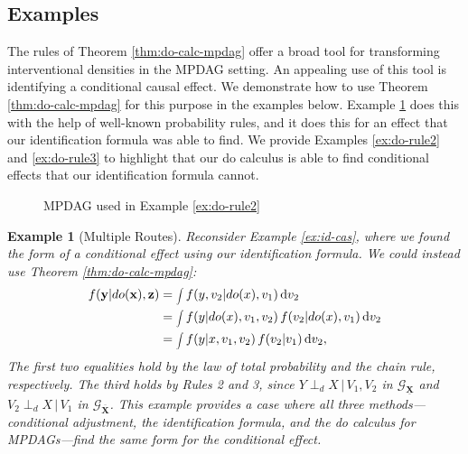 \documentclass[11pt]{article}
\newtheorem{example}{Example}
\newcommand{\mb}[1]{\mathbf{#1}}
\newcommand{\dsepp}{\perp_{d}}
\newcommand{\g}[1][G]{\mathcal{#1}}
\newcommand*\diff{\mathop{}\!\mathrm{d}}
\begin{document}

\subsection{Examples}
\label{sec:do-examples}

The rules of Theorem \ref{thm:do-calc-mpdag} offer a broad tool for transforming interventional densities in the MPDAG setting. An appealing use of this tool is identifying a conditional causal effect. We demonstrate how to use Theorem \ref{thm:do-calc-mpdag} for this purpose in the examples below. Example \ref{ex:do-multi} does this with the help of well-known probability rules, and it does this for an effect that our identification formula was able to find. We provide Examples \ref{ex:do-rule2} and \ref{ex:do-rule3} to highlight that our do calculus is able to find conditional effects that our identification formula cannot.


\begin{figure}
    \centering
    \caption{MPDAG used in Example \ref{ex:do-rule2}}
    \label{fig:ex-rules1+2}
\end{figure}


\begin{example}[Multiple Routes]
\label{ex:do-multi}
    Reconsider Example \ref{ex:id-cas}, where we found the form of a conditional effect using our identification formula. We could instead use Theorem \ref{thm:do-calc-mpdag}:
    \begin{align*}
        f(\mb{y}|do(\mb{x}),\mb{z})
            &=\scaleobj{.6}{\int} \,f(y, v_2|do(x), v_1) \diff v_2 \\
            &=\scaleobj{.6}{\int} \,f(y|do(x), v_1, v_2) \,f(v_2|do(x), v_1) \diff v_2 \\
            &=\scaleobj{.6}{\int} \,f(y|x, v_1, v_2) \,f(v_2|v_1) \diff v_2,
    \end{align*}
    The first two equalities hold by the law of total probability and the chain rule, respectively. The third holds by Rules 2 and 3, since $Y \dsepp X \,|\, V_1,V_2$ in $\g_{\underline{\mb{X}}}$ and $V_2 \dsepp X \,|\, V_1$ in $\g_{\overline{\mb{X}}}$. This example provides a case where all three methods---conditional adjustment, the identification formula, and the do calculus for MPDAGs---find the same form for the conditional effect.
\end{example}
\end{document}
